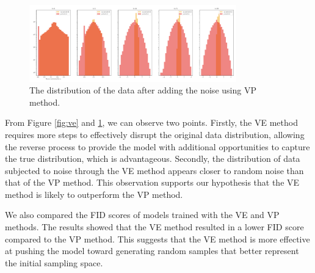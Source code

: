 \begin{figure}[h!]
    \centering
    \includegraphics[width=0.8\textwidth]{Figures/VP_5_0.0001.png}
    \caption{The distribution of the data after adding the noise using VP method.} \label{fig:vp}
\end{figure}

From Figure \ref{fig:ve} and \ref{fig:vp}, we can observe two points. Firstly, the VE method requires more steps to effectively disrupt the original data distribution, allowing the reverse process to provide the model with additional opportunities to capture the true distribution, which is advantageous. Secondly, the distribution of data subjected to noise through the VE method appears closer to random noise than that of the VP method. This observation supports our hypothesis that the VE method is likely to outperform the VP method. 

We also compared the FID scores of models trained with the VE and VP methods. The results showed that the VE method resulted in a lower FID score compared to the VP method. This suggests that the VE method is more effective at pushing the model toward generating random samples that better represent the initial sampling space.


